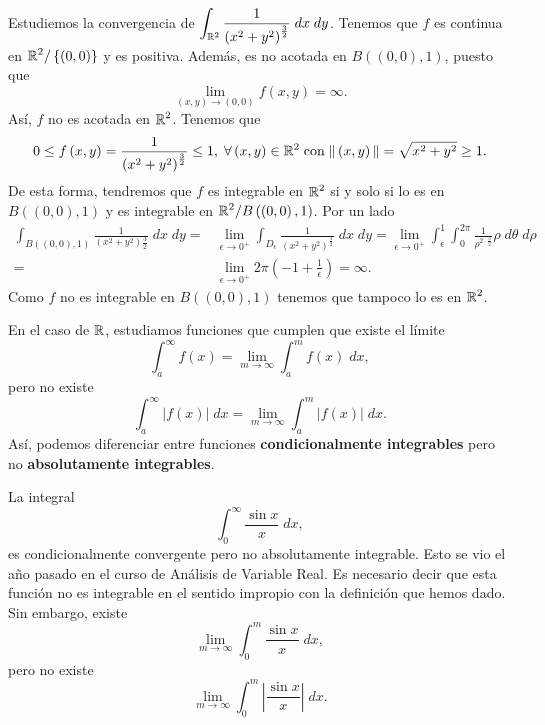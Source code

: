 \begin{eg}
	Estudiemos la convergencia de $\displaystyle \int _{\mathbb{R}^{2}}\frac{1}{\left(x^{2}+y^{2}\right)^{\frac{3}{2}}} \; dx \; dy $. Tenemos que $\displaystyle f  $ es continua en $\displaystyle \mathbb{R}^{2} / \left\{ \left(0,0\right)\right\}  $ y es positiva. Además, es no acotada en $\displaystyle B\left(\left(0,0\right), 1\right) $, puesto que 
	\[\lim_{\left(x,y\right) \to \left(0,0\right)}f\left(x,y\right) = \infty .\]
Así, $\displaystyle f $ no es acotada en $\displaystyle \mathbb{R}^{2} $. Tenemos que
\[0 \leq f\left(x,y\right)=\frac{1}{\left(x^{2}+y^{2}\right)^{\frac{3}{2}}}\leq 1, \; \forall \left(x,y\right)\in \mathbb{R}^{2} \; \text{con}\; \|\left(x,y\right)\| = \sqrt{x^{2}+y^{2}}\geq 1 .\]
De esta forma, tendremos que $\displaystyle f $ es integrable en $\displaystyle \mathbb{R}^{2} $ si y solo si lo es en $\displaystyle B\left(\left(0,0\right), 1\right) $ y es integrable en $\displaystyle \mathbb{R}^{2} / B\left(\left(0,0\right), 1\right) $. Por un lado
\[
\begin{split}
	\int _{B\left(\left(0,0\right), 1\right)}\frac{1}{\left(x^{2}+y^{2}\right)\frac{3}{2}} \; dx \; dy = & \lim_{\epsilon  \to 0^{+}}\int _{D_{\epsilon }}\frac{1}{\left(x^{2}+y^{2}\right)^{\frac{3}{2}}} \; dx \; dy =\lim_{\epsilon  \to 0^{+}}\int^{1}_{\epsilon } \int^{2\pi }_{0} \frac{1}{\rho^{2 \cdot \frac{3}{2}} } \rho\; d\theta  \; d\rho \\
	= & \lim_{\epsilon  \to 0^{+}}2\pi\left(-1+\frac{1}{\epsilon }\right) = \infty.
\end{split}
\]
Como $\displaystyle f $ no es integrable en $\displaystyle B\left(\left(0,0\right), 1\right) $ tenemos que tampoco lo es en $\displaystyle \mathbb{R}^{2} $. 
\end{eg}
\begin{observation}
En el caso de $\displaystyle \mathbb{R} $, estudiamos funciones que cumplen que existe el límite
\[\int^{\infty}_{a} f\left(x\right) =\lim_{m \to \infty}\int^{m}_{a} f\left(x\right) \; dx ,\]
pero no existe 
\[\int^{\infty}_{a} \left|f\left(x\right)\right| \; dx = \lim_{m \to \infty}\int^{m}_{a} \left|f\left(x\right)\right| \; dx .\]
Así, podemos diferenciar entre funciones \textbf{condicionalmente integrables} pero no \textbf{absolutamente integrables}.
\end{observation}

\begin{eg}
La integral
\[\int^{\infty}_{0} \frac{\sin x}{x} \; dx ,\]
es condicionalmente convergente pero no absolutamente integrable. Esto se vio el año pasado en el curso de Análisis de Variable Real. Es necesario decir que esta función no es integrable en el sentido impropio con la definición que hemos dado. Sin embargo, existe
\[\lim_{m \to \infty}\int^{m}_{0} \frac{\sin x}{x} \; dx ,\]
pero no existe 
\[\lim_{m \to \infty}\int^{m}_{0} \left|\frac{\sin x}{x}\right| \; dx .\]
\end{eg}
